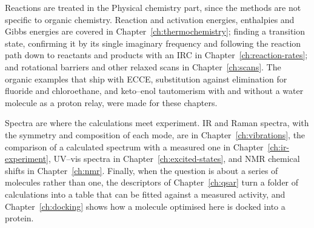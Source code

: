 Reactions are treated in the Physical chemistry part, since the methods are not specific to organic chemistry. Reaction and activation energies, enthalpies and Gibbs energies are covered in Chapter~\ref{ch:thermochemistry}; finding a transition state, confirming it by its single imaginary frequency and following the reaction path down to reactants and products with an IRC in Chapter~\ref{ch:reaction-rates}; and rotational barriers and other relaxed scans in Chapter~\ref{ch:scans}. The organic examples that ship with ECCE, substitution against elimination for fluoride and chloroethane, and keto--enol tautomerism with and without a water molecule as a proton relay, were made for these chapters.

Spectra are where the calculations meet experiment. IR and Raman spectra, with the symmetry and composition of each mode, are in Chapter~\ref{ch:vibrations}, the comparison of a calculated spectrum with a measured one in Chapter~\ref{ch:ir-experiment}, UV--vis spectra in Chapter~\ref{ch:excited-states}, and NMR chemical shifts in Chapter~\ref{ch:nmr}. Finally, when the question is about a series of molecules rather than one, the descriptors of Chapter~\ref{ch:qsar} turn a folder of calculations into a table that can be fitted against a measured activity, and Chapter~\ref{ch:docking} shows how a molecule optimised here is docked into a protein.
